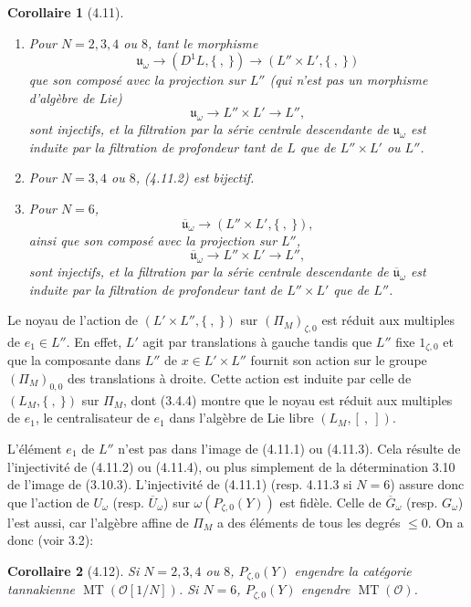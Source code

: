 \documentclass[10pt,a4paper]{article}
\newcommand{\MT}{\operatorname{MT}}
\newcommand{\OO}{\mathcal O}
\newcommand{\uomega}{\mathfrak u_\omega}
\theoremstyle{deligne}
\newtheorem*{corollary*}{Corollaire}
\begin{document}
\begin{corollary*}[4.11]
\begin{enumerate}[label=(\roman*)]
\item Pour \(N=2,3,4\) ou \(8\), tant le morphisme
\[
\tag{4.11.1}
\uomega\longrightarrow(D^1L,\{\ ,\ \})\longrightarrow(L''\times L',\{\ ,\ \})
\]
que son composé avec la projection sur \(L''\) (qui n'est pas un morphisme d'algèbre de Lie)
\[
\tag{4.11.2}
\uomega\longrightarrow L''\times L'\longrightarrow L'',
\]
sont injectifs, et la filtration par la série centrale descendante de \(\uomega\) est induite par la filtration de profondeur tant de \(L\) que de \(L''\times L'\) ou \(L''\).
\item Pour \(N=3,4\) ou \(8\), (4.11.2) est bijectif.
\item Pour \(N=6\),
\[
\tag{4.11.3}
\overline{\mathfrak u}_\omega\longrightarrow(L''\times L',\{\ ,\ \}),
\]
ainsi que son composé avec la projection sur \(L''\),
\[
\tag{4.11.4}
\overline{\mathfrak u}_\omega\longrightarrow L''\times L'\longrightarrow L'',
\]
sont injectifs, et la filtration par la série centrale descendante de \(\overline{\mathfrak u}_\omega\) est induite par la filtration de profondeur tant de \(L''\times L'\) que de \(L''\).
\end{enumerate}
\end{corollary*}

Le noyau de l'action de \((L'\times L'',\{\ ,\ \})\) sur \((\Pi_M)_{\zeta,0}\) est réduit aux multiples de \(e_1\in L''\). En effet, \(L'\) agit par translations à gauche tandis que \(L''\) fixe \(1_{\zeta,0}\) et que la composante dans \(L''\) de \(x\in L'\times L''\) fournit son action sur le groupe \((\Pi_M)_{0,0}\) des translations à droite. Cette action est induite par celle de \((L_M,\{\ ,\ \})\) sur \(\Pi_M\), dont (3.4.4) montre que le noyau est réduit aux multiples de \(e_1\), le centralisateur de \(e_1\) dans l'algèbre de Lie libre \((L_M,[\ ,\ ])\).

L'élément \(e_1\) de \(L''\) n'est pas dans l'image de (4.11.1) ou (4.11.3). Cela résulte de l'injectivité de (4.11.2) ou (4.11.4), ou plus simplement de la détermination 3.10 de l'image de (3.10.3). L'injectivité de (4.11.1) (resp. 4.11.3 si \(N=6\)) assure donc que l'action de \(U_\omega\) (resp. \(\overline U_\omega\)) sur \(\omega(P_{\zeta,0}(Y))\) est fidèle. Celle de \(\overline G_\omega\) (resp. \(G_\omega\)) l'est aussi, car l'algèbre affine de \(\Pi_M\) a des éléments de tous les degrés \(\le0\). On a donc (voir 3.2):

\begin{corollary*}[4.12]
Si \(N=2,3,4\) ou \(8\), \(P_{\zeta,0}(Y)\) engendre la catégorie tannakienne \(\MT(\OO[1/N])\). Si \(N=6\), \(P_{\zeta,0}(Y)\) engendre \(\MT(\OO)\).
\end{corollary*}
\end{document}
